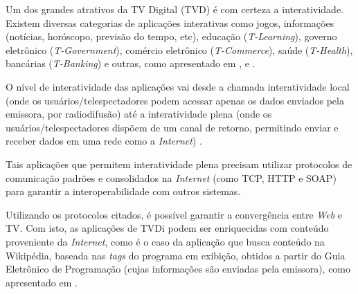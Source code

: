 
Um dos grandes atrativos da TV Digital (TVD) é com certeza a interatividade. Existem diversas categorias
de aplicações interativas como jogos, informações (notícias, horóscopo, previsão do tempo, etc), 
educação (\textit{T-Learning}), governo eletrônico (\textit{T-Government}), comércio eletrônico (\textit{T-Commerce}), 
saúde (\textit{T-Health}), bancárias (\textit{T-Banking}) e outras, como apresentado em \cite{fernandez2008aplicaciones},
\cite{de-usabilidade} e \cite{tgov2010barbosa}.

O nível de interatividade das aplicações vai desde a chamada interatividade local
(onde os usuários/telespectadores podem acessar apenas os dados enviados pela emissora, por radiodifusão)
até a interatividade plena (onde os usuários/telespectadores dispõem de um canal de retorno, permitindo
enviar e receber dados em uma rede como a \textit{Internet}) \cite{soares2009programando}. 

Tais aplicações que permitem interatividade plena precisam utilizar protocolos de comunicação 
padrões e consolidados na \textit{Internet} (como TCP, HTTP e SOAP) para garantir a interoperabilidade
com outros sistemas. 

Utilizando os protocolos citados, é possível garantir a convergência entre \textit{Web} e TV.
Com isto, as aplicações de TVDi podem ser enriquecidas com conteúdo proveniente da \textit{Internet},
como é o caso da aplicação que busca conteúdo na Wikipédia, baseada nas \textit{tags}
do programa em exibição, obtidos a partir do Guia Eletrônico de Programação 
(cujas informações são enviadas pela emissora), 
como apresentado em \cite{socialnets-tvd2010ghisi}.

